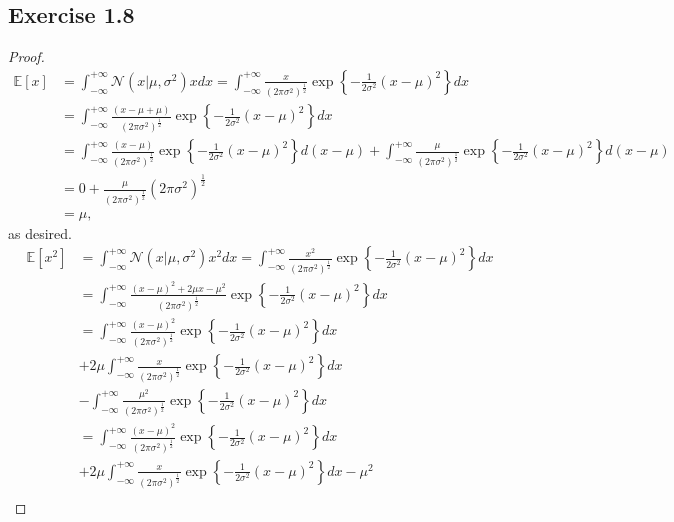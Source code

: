 \documentclass[11pt]{article}
\theoremstyle{definition}
\newcommand{\E}{\mathbb{E}}
\begin{document}
\subsection{Exercise 1.8}
\begin{proof}
\begin{align*}
\E[x] &= \int^{+\infty}_{-\infty}\mathcal{N}\left(x|\mu,\sigma^2\right)xdx = \int^{+\infty}_{-\infty}\frac{x}{(2\pi\sigma^2)^{\frac{1}{2}}}\exp\left\{-\frac{1}{2\sigma^2}\left(x-\mu\right)^2\right\}dx\\
&= \int^{+\infty}_{-\infty}\frac{(x-\mu+\mu)}{(2\pi\sigma^2)^{\frac{1}{2}}}\exp\left\{-\frac{1}{2\sigma^2}\left(x-\mu\right)^2\right\}dx\\
&= \int^{+\infty}_{-\infty}\frac{(x-\mu)}{(2\pi\sigma^2)^{\frac{1}{2}}}\exp\left\{-\frac{1}{2\sigma^2}\left(x-\mu\right)^2\right\}d(x-\mu) +  \int^{+\infty}_{-\infty}\frac{\mu}{(2\pi\sigma^2)^{\frac{1}{2}}}\exp\left\{-\frac{1}{2\sigma^2}\left(x-\mu\right)^2\right\}d(x-\mu)\\
&= 0 + \frac{\mu}{(2\pi\sigma^2)^{\frac{1}{2}}}(2\pi\sigma^2)^{\frac{1}{2}}\\
&= \mu,
\end{align*}
as desired.
\begin{align*}
\E[x^2] &= \int^{+\infty}_{-\infty}\mathcal{N}\left(x|\mu,\sigma^2\right)x^2dx = \int^{+\infty}_{-\infty}\frac{x^2}{(2\pi\sigma^2)^{\frac{1}{2}}}\exp\left\{-\frac{1}{2\sigma^2}\left(x-\mu\right)^2\right\}dx\\
&= \int^{+\infty}_{-\infty}\frac{(x-\mu)^2+2\mu x - \mu^2}{(2\pi\sigma^2)^{\frac{1}{2}}}\exp\left\{-\frac{1}{2\sigma^2}\left(x-\mu\right)^2\right\}dx\\
&= \int^{+\infty}_{-\infty}\frac{(x-\mu)^2}{(2\pi\sigma^2)^{\frac{1}{2}}}\exp\left\{-\frac{1}{2\sigma^2}\left(x-\mu\right)^2\right\}dx\\ &+ 2\mu \int^{+\infty}_{-\infty}\frac{x}{(2\pi\sigma^2)^{\frac{1}{2}}}\exp\left\{-\frac{1}{2\sigma^2}\left(x-\mu\right)^2\right\}dx\\ & - \int^{+\infty}_{-\infty}\frac{\mu^2}{(2\pi\sigma^2)^{\frac{1}{2}}}\exp\left\{-\frac{1}{2\sigma^2}\left(x-\mu\right)^2\right\}dx\\
&= \int^{+\infty}_{-\infty}\frac{(x-\mu)^2}{(2\pi\sigma^2)^{\frac{1}{2}}}\exp\left\{-\frac{1}{2\sigma^2}\left(x-\mu\right)^2\right\}dx\\ &+ 2\mu \int^{+\infty}_{-\infty}\frac{x}{(2\pi\sigma^2)^{\frac{1}{2}}}\exp\left\{-\frac{1}{2\sigma^2}\left(x-\mu\right)^2\right\}dx -\mu^2\\

\end{align*}
\end{proof}
\end{document}
